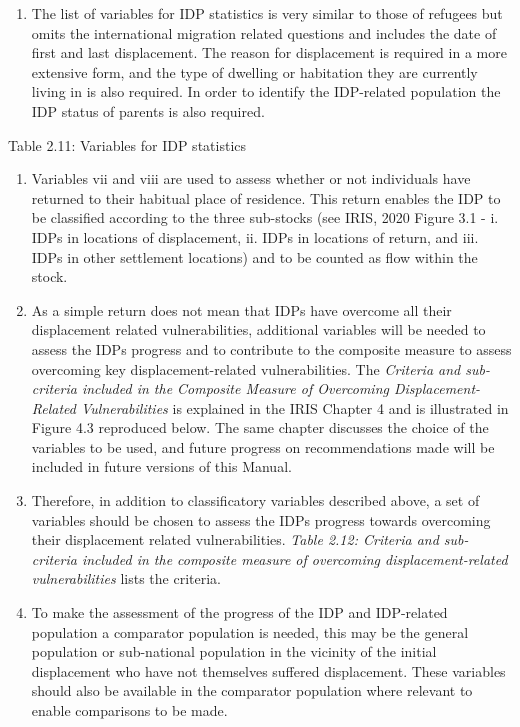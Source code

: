 \documentclass[
]{article}
\providecommand{\tightlist}{%
  \setlength{\itemsep}{0pt}\setlength{\parskip}{0pt}}
\begin{document}
\begin{enumerate}
\def\labelenumi{\arabic{enumi}.}
\setcounter{enumi}{78}
\tightlist
\item
  The list of variables for IDP statistics is very similar to those of
  refugees but omits the international migration related questions and
  includes the date of first and last displacement. The reason for
  displacement is required in a more extensive form, and the type of
  dwelling or habitation they are currently living in is also
  required. In order to identify the IDP-related population the IDP
  status of parents is also required.
\end{enumerate}

Table 2.11: Variables for IDP statistics

\begin{enumerate}
\def\labelenumi{\arabic{enumi}.}
\setcounter{enumi}{79}
\item
  Variables vii and viii are used to assess whether or not individuals
  have returned to their habitual place of residence. This return
  enables the IDP to be classified according to the three sub-stocks
  (see IRIS, 2020 Figure 3.1 - i. IDPs in locations of
  displacement, ii. IDPs in locations of return, and iii. IDPs in
  other settlement locations) and to be counted as flow within the
  stock.
\item
  As a simple return does not mean that IDPs have overcome all their
  displacement related vulnerabilities, additional variables will be
  needed to assess the IDPs progress and to contribute to the
  composite measure to assess overcoming key displacement-related
  vulnerabilities. The \emph{Criteria and sub-criteria included in the
  Composite Measure of Overcoming Displacement-Related
  Vulnerabilities} is explained in the IRIS Chapter 4 and is
  illustrated in Figure 4.3 reproduced below. The same chapter
  discusses the choice of the variables to be used, and future
  progress on recommendations made will be included in future versions
  of this Manual.
\item
  Therefore, in addition to classificatory variables described above,
  a set of variables should be chosen to assess the IDPs progress
  towards overcoming their displacement related vulnerabilities.
  \emph{Table 2.12: Criteria and sub-criteria included in the composite
  measure of overcoming displacement-related vulnerabilities} lists
  the criteria.
\item
  To make the assessment of the progress of the IDP and IDP-related
  population a comparator population is needed, this may be the
  general population or sub-national population in the vicinity of the
  initial displacement who have not themselves suffered displacement.
  These variables should also be available in the comparator
  population where relevant to enable comparisons to be made.
\end{enumerate}
\end{document}
